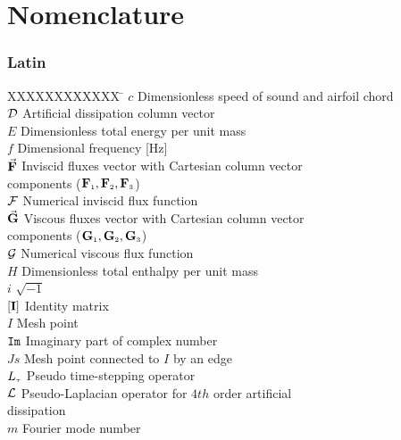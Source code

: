 %
%
\chapter*{Nomenclature}
\label{nomenclature}
%
\subsection*{Latin}
%
\begin{tabbing}
XXXXXXXXXXXX \= \kill
$c$                    \> Dimensionless speed of sound and airfoil chord\\
${\cal D}$             \> Artificial dissipation column vector\\
$E$                    \> Dimensionless total energy per unit mass\\
$f$                    \> Dimensional frequency [Hz]\\
$\vec{\bf F}$          \> Inviscid fluxes vector with Cartesian column vector\\
                       \> components (${\bf F}_{\mbox{\tiny $1$}},{\bf F}_{\mbox{\tiny $2$}},{\bf F}_{\mbox{\tiny $3$}}$)\\
$\cal{F}$              \> Numerical inviscid flux function\\
$\vec{\bf G}$          \> Viscous fluxes vector with Cartesian column vector\\
                       \> components (${\bf G}_{\mbox{\tiny $1$}},{\bf G}_{\mbox{\tiny $2$}},{\bf G}_{\mbox{\tiny $3$}}$)\\
$\cal{G}$              \> Numerical viscous flux function\\
$H$                    \> Dimensionless total enthalpy per unit mass\\
$i$                    \> $\sqrt{-1}$\\
$\left[{\bf I}\right]$ \> Identity matrix\\
$I$                    \> Mesh point\\
${\tt Im}$             \> Imaginary part of complex number\\
$Js$                   \> Mesh point connected to $I$ by an edge\\
$L_{\mbox{\tiny $\tau$}}$           \> Pseudo time-stepping operator\\
${\cal L}$             \> Pseudo-Laplacian operator for $4th$ order artificial\\
                       \> dissipation\\
$m$                    \> Fourier mode number\\

\end{tabbing}
